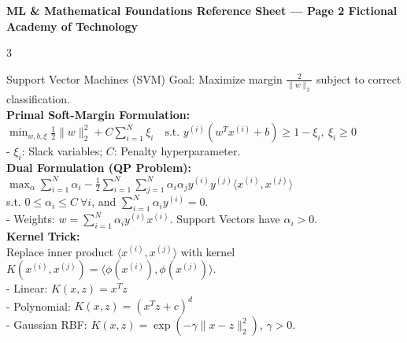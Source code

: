 \documentclass[10pt]{article}
\begin{document}
\newpage

\begin{center}
    \begin{tcolorbox}[
        colback=headerBg,
        colframe=mlColor!80!black,
        arc=3pt,
        left=6pt,
        right=6pt,
        top=3pt,
        bottom=3pt,
        boxrule=0.6pt
    ]
        \textbf{\sffamily ML \& Mathematical Foundations Reference Sheet --- Page 2 \hfill Fictional Academy of Technology}
    \end{tcolorbox}
\end{center}
\vspace{-6pt}

\begin{multicols*}{3}

\begin{mlBox}{Support Vector Machines (SVM)}
Goal: Maximize margin $\frac{2}{\|w\|_2}$ subject to correct classification. \\
\textbf{Primal Soft-Margin Formulation:} \\
$\min_{w, b, \xi} \frac{1}{2} \|w\|_2^2 + C \sum_{i=1}^N \xi_i \quad \text{s.t. } y^{(i)}(w^T x^{(i)} + b) \ge 1 - \xi_i, \ \xi_i \ge 0$ \\
- $\xi_i$: Slack variables; $C$: Penalty hyperparameter. \\
\textbf{Dual Formulation (QP Problem):} \\
$\max_{\alpha} \sum_{i=1}^N \alpha_i - \frac{1}{2} \sum_{i=1}^N \sum_{j=1}^N \alpha_i \alpha_j y^{(i)} y^{(j)} \langle x^{(i)}, x^{(j)} \rangle$ \\
s.t. $0 \le \alpha_i \le C \ \forall i$, and $\sum_{i=1}^N \alpha_i y^{(i)} = 0$. \\
- Weights: $w = \sum_{i=1}^N \alpha_i y^{(i)} x^{(i)}$. Support Vectors have $\alpha_i > 0$. \\
\textbf{Kernel Trick:} \\
Replace inner product $\langle x^{(i)}, x^{(j)} \rangle$ with kernel $K(x^{(i)}, x^{(j)}) = \langle \phi(x^{(i)}), \phi(x^{(j)}) \rangle$. \\
- Linear: $K(x, z) = x^T z$ \\
- Polynomial: $K(x, z) = (x^T z + c)^d$ \\
- Gaussian RBF: $K(x, z) = \exp(-\gamma \|x - z\|_2^2)$, $\gamma > 0$.
\end{mlBox}


\end{multicols*}
\end{document}

